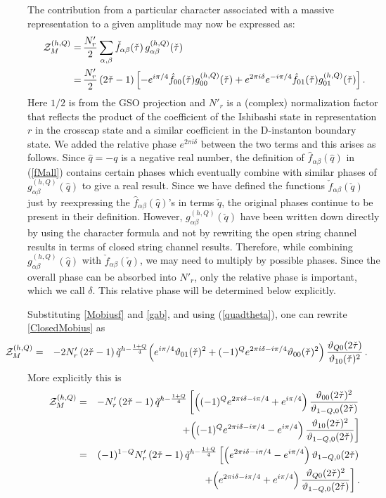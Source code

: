 \documentclass[12pt,a4paper]{article}
\newcommand{\be}{\begin{equation}}
\newcommand{\ee}{\end{equation}}
\newcommand{\ben}{\begin{eqnarray}\displaystyle}
\newcommand{\een}{\end{eqnarray}}
\newcommand{\refb}[1]{(\ref{#1})}
\newcommand{\I}{\mathrm{i}}
\def\[{\left[}
\def\]{\right]}
\newcommand{\non}{\nonumber}
\newcommand{\vt}{\vartheta}
\def\ghQ{g^{(h,Q)}}
\def\I{i}
\def\hq{\hat q}
\def\cq{\check q}
\def\ctau{\check\tau}
\begin{document}
The contribution from a particular character associated with a massive representation
to a given amplitude may now be expressed as:
\be
\begin{split}
\ZZhQ_{M} =&\, {N'_r \over 2}
\sum_{\alpha,\beta}  \check f_{\alpha\beta}(\check \tau)\, \ghQ_{\alpha\beta}(\check \tau)
\\
= &\, {N'_r \over 2}\, (2 \ctau -1) \[-e^{\I \pi/4}
\hat f_{00} (\ctau) \ghQ_{00} (\ctau) + e^{2 \pi i\delta} e^{-\I \pi/4} \hat f_{01} (\ctau) \ghQ_{01} (\ctau) \].
\end{split}
\label{ClosedMobius}
\ee
Here $1/2$ is from the GSO projection and $N'_r$ is a (complex) normalization factor
that reflects the product of the coefficient of the Ishibashi state in
representation $r$ in the crosscap state and  a similar coefficient
in the D-instanton boundary state.
We added the relative phase $e^{2 \pi i\delta}$ between the two terms and this arises as follows.
Since $\hq=-q$ is a negative real number, the definition of $\hat f_{\alpha\beta}(\hq)$ in \refb{fMall} contains
certain phases which eventually combine with similar phases of $\ghQ_{\alpha\beta}(\hq)$ to give
a real result. Since we have defined the functions $\check f_{\alpha\beta}(\check q)$ just by
reexpressing the $\hat f_{\alpha\beta}(\hq)$'s in terms $\check q$, the original phases
continue to be present in their definition. However, $\ghQ_{\alpha\beta}(\check q)$
have been written down directly by using the character formula
and not by rewriting the open string channel results in terms of closed string channel results.
Therefore, while combining $\ghQ_{\alpha\beta}(\hq)$ with $\check f_{\alpha\beta}(\check q)$,
we may need to multiply by possible phases. Since the overall phase can be absorbed into
$N'_r$, only the relative phase is important, which we call $\delta$. This relative phase will be
determined below explicitly.

Substituting \eqref{Mobiusf} and \eqref{gab}, and using \refb{quadtheta},
one can rewrite \eqref{ClosedMobius} as
\ben
\hspace{-0.5in}
\ZZhQ_{M}  &=& -2N'_r \, (2 \ctau -1)\, \cq^{h - {1 +Q \over 4} }
\Bigl(e^{\I \pi/4}\vt_{01} (\ctau)^2 + (-1)^Q e^{2 \pi i\delta-\I \pi/4}
\vt_{00} (\ctau)^2 \Bigr)\,\frac{\vt_{Q0} (2\ctau)}{\vt_{10} (\ctau)^2} \, .
\een
More explicitly this is
\ben \label{eE.49}
\ZZhQ_{M} &=& -N'_r \, (2 \ctau -1)\,\cq^{h - {1 +Q \over 4} }
\[\Bigl((-1)^Qe^{2 \pi i\delta-\I \pi/4}+e^{\I \pi/4}\Bigr)\, \frac{\vt_{00} (2\ctau)^2}{\vt_{1-Q,0} (2\ctau)}
\right.
\non\\
&&\left.\qquad
+\Bigl((-1)^Qe^{2 \pi i\delta-\I \pi/4}-e^{\I \pi/4}\Bigr)\, \frac{\vt_{10} (2\ctau)^2}{\vt_{1-Q,0} (2\ctau)}\]
\non\\
&=& (-1)^{1-Q} N'_r \, (2 \ctau -1)\,\cq^{h - {1 +Q \over 4} }
\[\Bigl(e^{2 \pi i\delta-\I \pi/4}-e^{\I \pi/4}\Bigr)\, \vt_{1-Q,0} (2\ctau)
\right.
\non\\
&&\left.\qquad
+\Bigl(e^{2 \pi i\delta-\I \pi/4}+e^{\I \pi/4}\Bigr)\, \frac{\vt_{Q0} (2\ctau)^2}{\vt_{1-Q,0} (2\ctau)}\].
\een
\end{document}
